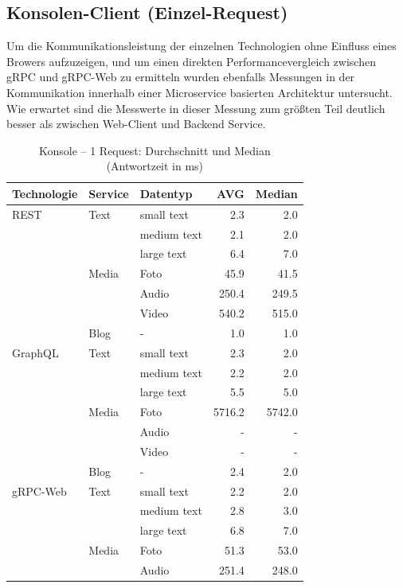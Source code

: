 \clearpage
\subsection{Konsolen-Client (Einzel-Request)}
Um die Kommunikationsleistung der einzelnen Technologien ohne Einfluss eines Browers aufzuzeigen, und um einen direkten Performancevergleich zwischen gRPC und gRPC-Web zu ermitteln wurden ebenfalls Messungen in der Kommunikation innerhalb einer Microservice basierten Architektur untersucht. Wie erwartet sind die Messwerte in dieser Messung zum größten Teil deutlich besser als zwischen Web-Client und Backend Service.  

\begin{table}[h]
	\centering
	\caption{Konsole – 1 Request: Durchschnitt und Median (Antwortzeit in ms)}
	\label{tab:console-1req}
	\renewcommand{\arraystretch}{1.1}
	\begin{tabular}{|l|l|l|r|r|}
		\hline
		\textbf{Technologie} & \textbf{Service} & \textbf{Datentyp} & \textbf{AVG} & \textbf{Median} \\
		\hline
		REST & Text  & small text  & 2.3 & 2.0 \\
		&       & medium text & 2.1 & 2.0 \\
		&       & large text  & 6.4 & 7.0 \\
		& Media & Foto        & 45.9 & 41.5 \\
		&       & Audio       & 250.4 & 249.5 \\
		&       & Video       & 540.2 & 515.0 \\
		& Blog  & -           & 1.0 & 1.0 \\
		\hline
		GraphQL & Text  & small text  & 2.3 & 2.0 \\
		&       & medium text & 2.2 & 2.0 \\
		&       & large text  & 5.5 & 5.0 \\
		& Media & Foto        & 5716.2 & 5742.0 \\
		&       & Audio       & - & - \\
		&       & Video       & - & - \\
		& Blog  & -           & 2.4 & 2.0 \\
		\hline
		gRPC-Web & Text  & small text  & 2.2 & 2.0 \\
		&       & medium text & 2.8 & 3.0 \\
		&       & large text  & 6.8 & 7.0 \\
		& Media & Foto        & 51.3 & 53.0 \\
		&       & Audio       & 251.4 & 248.0 \\

\end{tabular}
\end{table}
